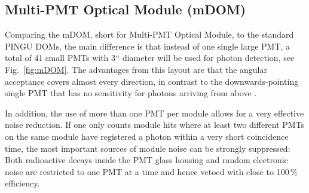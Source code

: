 \subsection{Multi-PMT Optical Module (mDOM)}
\label{sec:mDOM}

Comparing the mDOM, short for Multi-PMT Optical Module, to the standard PINGU
DOMs, the main difference is that instead of one single large PMT, a total of
41 small PMTs with 3\verb+"+ diameter will be used for photon detection, see
Fig.~\ref{fig:mDOM}. The advantages from this layout are that the angular
acceptance covers almost every direction, in contrast to the downwards-pointing
single PMT that has no sensitivity for photons arriving from above
\cite{mDOM_Geneva}.

In addition, the use of more than one PMT per module allows for a very
effective noise reduction. If one only counts module hits where at least two
different PMTs on the same module have registered a photon within a very short
coincidence time, the most important sources of module noise can be strongly
suppressed: Both radioactive decays inside the PMT glass housing and random
electronic noise are restricted to one PMT at a time and hence vetoed with
close to 100\,\% efficiency.
